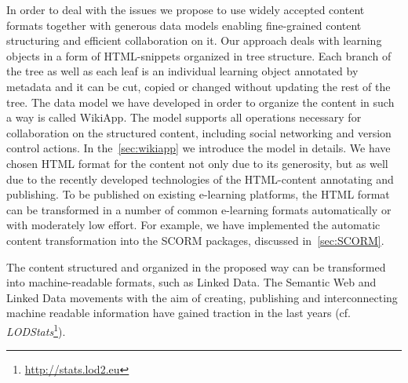\documentclass[ngerman,UKenglish,table]{scrbook}
\begin{document}
In order to deal with the issues we propose to use widely accepted content formats together with generous data models enabling fine-grained content structuring and efficient collaboration on it.
Our approach deals with learning objects in a form of HTML-snippets organized in tree structure.
Each branch of the tree as well as each leaf is an individual learning object annotated by metadata and it can be cut, copied or changed without updating the rest of the tree.
The data model we have developed in order to organize the content in such a way is called WikiApp.
The model supports all operations necessary for collaboration on the structured content, including social networking and version control actions.
In the~\autoref{sec:wikiapp} we introduce the model in details.
We have chosen HTML format for the content not only due to its generosity, but as well due to the recently developed technologies of the HTML-content annotating and publishing.
To be published on existing e-learning platforms, the HTML format can be transformed in a number of common e-learning formats automatically or with moderately low effort.
For example, we have implemented the automatic content transformation into the SCORM packages, discussed in~\autoref{sec:SCORM}.

The content structured and organized in the proposed way can be transformed into machine-readable formats, such as Linked Data.
The Semantic Web and Linked Data movements with the aim of creating, publishing and interconnecting machine readable information have gained traction in the last years (cf. \emph{LODStats}\footnote{\url{http://stats.lod2.eu}}).
\end{document}
